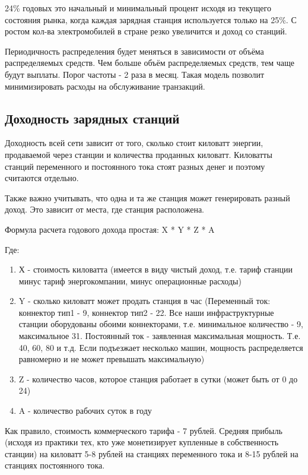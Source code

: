 \documentclass[a4paper,12pt]{report}
\begin{document}
24\% годовых это начальный и минимальный процент исходя из текущего состояния рынка, когда каждая зарядная станция используется только на 25\%. С ростом кол-ва электромобилей в стране резко увеличится и доход со станций.  

Периодичность распределения будет меняться в зависимости от объёма распределяемых средств. Чем больше объём распределяемых средств, тем чаще будут выплаты. Порог частоты - 2 раза в месяц. Такая модель позволит минимизировать расходы на обслуживание транзакций.

\subsection{Доходность зарядных станций}

Доходность всей сети зависит от того, сколько стоит киловатт энергии, продаваемой через станции и количества проданных киловатт. Киловатты станций переменного и постоянного тока стоят разных денег и поэтому считаются отдельно. 

Также важно учитывать, что одна и та же станция может генерировать разный доход. Это зависит от места, где станция расположена.

Формула расчета годового дохода простая: X * Y * Z * A 


Где:
\begin{enumerate}

	\item Х - стоимость киловатта (имеется в виду чистый доход, т.е. тариф станции минус тариф энергокомпании, минус операционные расходы)

	\item Y - сколько киловатт может продать станция в час (Переменный ток: коннектор тип1 - 9, коннектор тип2 - 22. Все наши инфраструктурные станции оборудованы обоими коннекторами, т.е. минимальное количество - 9, максимальное 31. Постоянный ток - заявленная максимальная мощность. Т.е. 40, 60, 80 и т.д. Если подъезжает несколько машин, мощность распределяется равномерно и не может превышать максимальную)

	\item Z - количество часов, которое станция работает в сутки (может быть от 0 до 24)
	\item A - количество рабочих суток в году 
\end{enumerate}

Как правило, стоимость коммерческого тарифа - 7 рублей. Средняя прибыль (исходя из практики тех, кто уже монетизирует купленные в собственность станции) на киловатт 5-8 рублей на станциях переменного тока и 8-15 рублей на станциях постоянного тока. 
\end{document}
